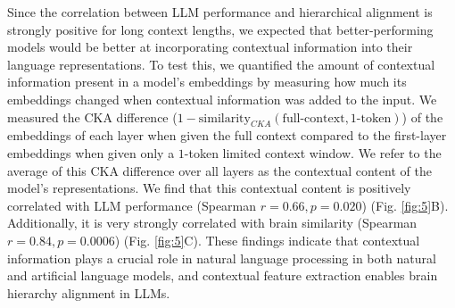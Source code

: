 Since the correlation between LLM performance and hierarchical alignment is strongly positive for long context lengths, we expected that better-performing models would be better at incorporating contextual information into their language representations. To test this, we quantified the amount of contextual information present in a model's embeddings by measuring how much its embeddings changed when contextual information was added to the input. We measured the CKA difference ($1 - \text{similarity}_{CKA}(\text{full-context}, \text{1-token})$) of the embeddings of each layer when given the full context compared to the first-layer embeddings when given only a $1$-token limited context window. We refer to the average of this CKA difference over all layers as the contextual content of the model's representations. We find that this contextual content is positively correlated with LLM performance (Spearman $r=0.66, p=0.020$) (Fig. \ref{fig:5}B). Additionally, it is very strongly correlated with brain similarity (Spearman $r=0.84, p=0.0006$) (Fig. \ref{fig:5}C). These findings indicate that contextual information plays a crucial role in natural language processing in both natural and artificial language models, and contextual feature extraction enables brain hierarchy alignment in LLMs.

